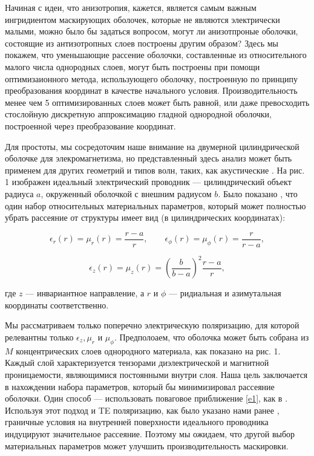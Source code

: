 \documentclass[a4paper, 12pt]{article}
\begin{document}
Начиная с идеи, что анизотропия, кажется, является самым важным ингридиентом
маскирующих оболочек, которые не являются электрически малыми, можно было бы
задаться вопросом, могут ли анизотпроные оболочки, состоящие из антизотропных 
слоев построены другим образом? Здесь мы покажем, что уменьшающие рассение
оболочки, составленные из относительного малого числа однородных слоев,
могут быть построены при помощи оптимизаионного метода, использующего 
оболочку, построенную по принципу преобразования координат в качестве начального 
условия.
Производительность менее чем 5 оптимизированных слоев может быть равной,
или даже превосходить стослойную дискретную аппроксимацию гладной однородной
оболочки, построенной через преобразование координат.

Для простоты, мы сосредоточим наше внимание на двумерной цилиндрической оболочке
для элекромагнетизма, но представленный здесь анализ может быть применем для
других геометрий и типов волн, таких, как акустические \cite{8}. На рис. 1
изображен идеальный электрический проводник --- цилиндрический объект радиуса
$a$, окруженный оболочкой с внешним радиусом $b$. Было показано \cite{2},
что один набор относительных материальных параметров, который может полностью
убрать рассеяние от структуры имеет вид (в цилиндрических координатах):

\begin{equation*}
	\epsilon_r(r) = \mu_r(r) = \frac{r-a}{r}, \qquad 
	\epsilon_\phi(r) = \mu_\phi(r) = \frac{r}{r-a},
\end{equation*}

\begin{equation}\label{e1}
	\epsilon_z(r) = \mu_z(r) = \left( \frac{b}{b-a}	\right)^2 \frac{r-a}{r},
\end{equation}

где $z$ --- инвариантное направление, а $r$ и $\phi$ --- ридиальная и азимутальная
координаты соответственно.

Мы рассматриваем только поперечно электрическую поляризацию, для которой
релевантны только $\epsilon_z, \mu_r$ и $\mu_\phi$. Предполоаем, что оболочка
может быть собрана из $M$ концентрических слоев однородного материала, как показано
на рис. 1. Каждый слой характеризуется тензорами диэлектрической и магнитной
проницаемости, являющимися постоянными внутри слоя. Наша цель заключается в 
нахождении набора параметров, который бы минимизировал рассеяние оболочки.
Один способ --- использовать поваговое приближение \eqref{e1}, как в \cite{4}.
Используя этот подход и TE поляризацию, как было указано нами ранее \cite{9,10},
граничные условия на внутренней поверхности идеального проводника индуцируют
значительное рассеяние. Поэтому мы ожидаем, что другой выбор материальных 
параметров может улучшить производительность маскировки.
\end{document}
